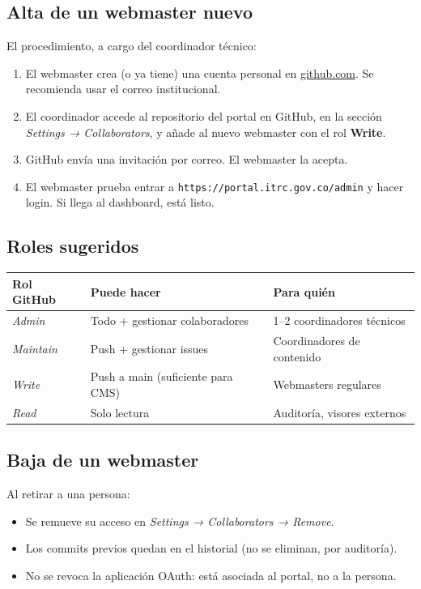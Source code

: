 \documentclass[11pt,a4paper]{article}
\begin{document}
\subsection{Alta de un webmaster nuevo}

El procedimiento, a cargo del coordinador técnico:

\begin{enumerate}[leftmargin=*]
  \item El webmaster crea (o ya tiene) una cuenta personal en \href{https://github.com}{github.com}. Se recomienda usar el correo institucional.
  \item El coordinador accede al repositorio del portal en GitHub, en la sección \textit{Settings → Collaborators}, y añade al nuevo webmaster con el rol \textbf{Write}.
  \item GitHub envía una invitación por correo. El webmaster la acepta.
  \item El webmaster prueba entrar a \texttt{https://portal.itrc.gov.co/admin} y hacer login. Si llega al dashboard, está listo.
\end{enumerate}

\subsection{Roles sugeridos}

\begin{center}
\begin{tabular}{@{}lll@{}}
\toprule
\textbf{Rol GitHub} & \textbf{Puede hacer} & \textbf{Para quién} \\
\midrule
\textit{Admin} & Todo + gestionar colaboradores & 1–2 coordinadores técnicos \\
\textit{Maintain} & Push + gestionar issues & Coordinadores de contenido \\
\textit{Write} & Push a main (suficiente para CMS) & Webmasters regulares \\
\textit{Read} & Solo lectura & Auditoría, visores externos \\
\bottomrule
\end{tabular}
\end{center}

\subsection{Baja de un webmaster}

Al retirar a una persona:
\begin{itemize}[leftmargin=*]
  \item Se remueve su acceso en \textit{Settings → Collaborators → Remove}.
  \item Los commits previos quedan en el historial (no se eliminan, por auditoría).
  \item No se revoca la aplicación OAuth: está asociada al portal, no a la persona.
\end{itemize}
\end{document}
